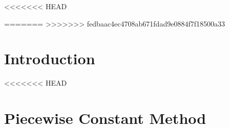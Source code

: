 % 
% 
% 
% 
% 







\begin{frame}{}
	\titlepage
\end{frame}


<<<<<<< HEAD

=======
>>>>>>> fedbaac4ec4708ab671fdad9e0884f7f18500a33
\section{Introduction}



<<<<<<< HEAD

\section{Piecewise Constant Method}




